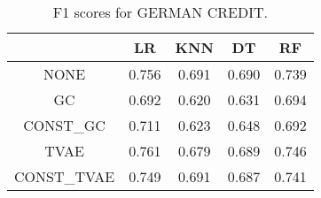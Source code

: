 \begin{table}
\caption{F1 scores for GERMAN CREDIT.}
\label{tab:f1-GERMAN CREDIT}
\begin{tabular}{ccccc}
\toprule
 & LR & KNN & DT & RF \\
\midrule
NONE & 0.756 & 0.691 & 0.690 & 0.739 \\
GC & 0.692 & 0.620 & 0.631 & 0.694 \\
CONST\_GC & 0.711 & 0.623 & 0.648 & 0.692 \\
TVAE & 0.761 & 0.679 & 0.689 & 0.746 \\
CONST\_TVAE & 0.749 & 0.691 & 0.687 & 0.741 \\
\bottomrule
\end{tabular}
\end{table}
